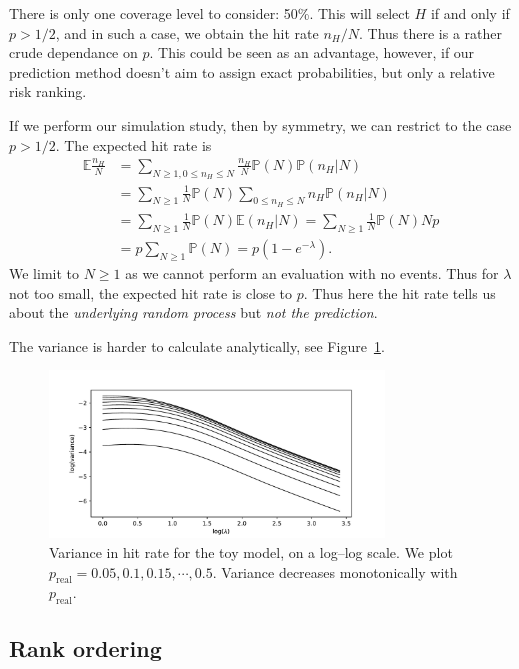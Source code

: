\documentclass[twoside,a4paper,twocolumn,10pt]{article}
\theoremstyle{plain}
\theoremstyle{definition}
\begin{document}
There is only one coverage level to consider: 50\%.  This will select $H$ if and only if
$p>1/2$, and in such a case, we obtain the hit rate $n_H / N$.  Thus there is
a rather crude dependance on $p$.  This could be seen as an advantage, however,
if our prediction method doesn't aim to assign exact probabilities, but only
a relative risk ranking.

If we perform our simulation study, then by symmetry, we can restrict to the
case $p>1/2$.  The expected hit rate is
\begin{align*} \mathbb{E} \frac{n_H}{N}
&= \sum_{N\geq 1, 0\leq n_H\leq N} \frac{n_H}{N} \mathbb P(N)
\mathbb P(n_H|N) \\
&= \sum_{N\geq 1} \frac{1}{N} \mathbb P(N) \sum_{0\leq n_H\leq N} n_H
\mathbb P(n_H|N) \\
&= \sum_{N\geq 1} \frac{1}{N} \mathbb P(N) \mathbb E(n_H|N)
= \sum_{N\geq 1} \frac{1}{N} \mathbb P(N) Np \\
&= p \sum_{N\geq 1} \mathbb P(N) = p(1-e^{-\lambda}).
\end{align*}
We limit to $N\geq 1$ as we cannot perform an evaluation with no events.  Thus
for $\lambda$ not too small, the expected hit rate is close to $p$.  Thus here the hit rate
tells us about the \emph{underlying random process} but \emph{not the prediction}.

The variance is harder to calculate analytically, see Figure~\ref{fig:hr1}.

\begin{figure}
  \includegraphics[width=3.5in]{../details/hitrate_detail1.pdf}
  \caption{Variance in hit rate for the toy model, on a log--log scale.
  We plot $p_{\text{real}} = 0.05, 0.1, 0.15, \cdots, 0.5$.  Variance
  decreases monotonically with $p_{\text{real}}$.}
  \label{fig:hr1}
\end{figure}



\subsection{Rank ordering}
\end{document}
